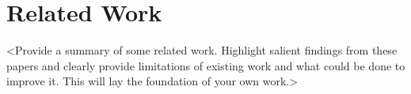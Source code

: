 \section{Related Work}
\label{sec:related-work}

<Provide a summary of some related work. Highlight salient findings from these
papers and clearly provide limitations of existing work and what could be done
to improve it. This will lay the foundation of your own work.>
